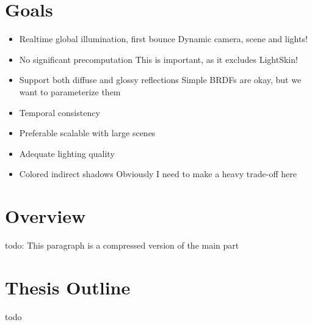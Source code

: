 \documentclass[thesis.tex]{subfiles}
\begin{document}
\section{Goals}
\begin{itemize}
\item Realtime global illumination, first bounce
\subitem Dynamic camera, scene and lights!
\item No significant precomputation
\subitem This is important, as it excludes LightSkin!
\item Support both diffuse and glossy reflections
\subitem Simple BRDFs are okay, but we want to parameterize them 
\item Temporal consistency
\item Preferable scalable with large scenes
\item Adequate lighting quality
\item Colored indirect shadows
\subitem Obviously I need to make a heavy trade-off here
\end{itemize}

\section{Overview}
todo: This paragraph is a compressed version of the main part

\section{Thesis Outline}
todo

\subfilebib %
\end{document}
